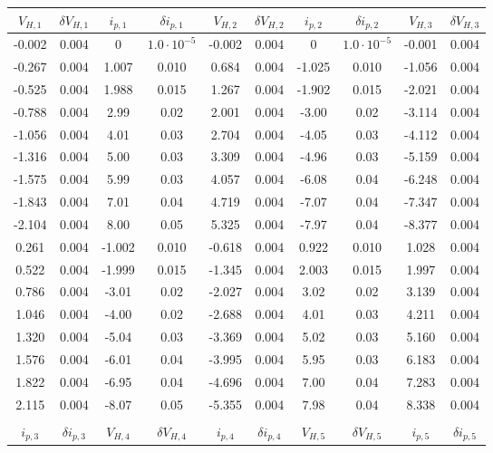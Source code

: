 \begin{table}
\centering \tiny
\begin{tabular}{cccccccccc}
$V_{H,1}$ & $\delta V_{H,1}$ & $i_{p,1}$ & $\delta i_{p,1}$ & $V_{H,2}$ & $\delta V_{H,2}$ & $i_{p,2}$ & $\delta i_{p,2}$ & $V_{H,3}$ & $\delta V_{H,3}$ \\
\hline
-0.002 & 0.004 & 0 & $1.0 \cdot 10^{-5}$ & -0.002 & 0.004 & 0 & $1.0 \cdot 10^{-5}$ & -0.001 & 0.004\\
-0.267 & 0.004 & 1.007 & 0.010 & 0.684 & 0.004 & -1.025 & 0.010 & -1.056 & 0.004\\
-0.525 & 0.004 & 1.988 & 0.015 & 1.267 & 0.004 & -1.902 & 0.015 & -2.021 & 0.004\\
-0.788 & 0.004 & 2.99 & 0.02 & 2.001 & 0.004 & -3.00 & 0.02 & -3.114 & 0.004\\
-1.056 & 0.004 & 4.01 & 0.03 & 2.704 & 0.004 & -4.05 & 0.03 & -4.112 & 0.004\\
-1.316 & 0.004 & 5.00 & 0.03 & 3.309 & 0.004 & -4.96 & 0.03 & -5.159 & 0.004\\
-1.575 & 0.004 & 5.99 & 0.03 & 4.057 & 0.004 & -6.08 & 0.04 & -6.248 & 0.004\\
-1.843 & 0.004 & 7.01 & 0.04 & 4.719 & 0.004 & -7.07 & 0.04 & -7.347 & 0.004\\
-2.104 & 0.004 & 8.00 & 0.05 & 5.325 & 0.004 & -7.97 & 0.04 & -8.377 & 0.004\\
0.261 & 0.004 & -1.002 & 0.010 & -0.618 & 0.004 & 0.922 & 0.010 & 1.028 & 0.004\\
0.522 & 0.004 & -1.999 & 0.015 & -1.345 & 0.004 & 2.003 & 0.015 & 1.997 & 0.004\\
0.786 & 0.004 & -3.01 & 0.02 & -2.027 & 0.004 & 3.02 & 0.02 & 3.139 & 0.004\\
1.046 & 0.004 & -4.00 & 0.02 & -2.688 & 0.004 & 4.01 & 0.03 & 4.211 & 0.004\\
1.320 & 0.004 & -5.04 & 0.03 & -3.369 & 0.004 & 5.02 & 0.03 & 5.160 & 0.004\\
1.576 & 0.004 & -6.01 & 0.04 & -3.995 & 0.004 & 5.95 & 0.03 & 6.183 & 0.004\\
1.822 & 0.004 & -6.95 & 0.04 & -4.696 & 0.004 & 7.00 & 0.04 & 7.283 & 0.004\\
2.115 & 0.004 & -8.07 & 0.05 & -5.355 & 0.004 & 7.98 & 0.04 & 8.338 & 0.004\\
      &&&&&&&&&\\
$i_{p,3}$ & $\delta i_{p,3}$ & $V_{H,4}$ & $\delta V_{H,4}$ & $i_{p,4}$ & $\delta i_{p,4}$ & $V_{H,5}$ & $\delta V_{H,5}$ & $i_{p,5}$ & $\delta i_{p,5}$ \\

\end{tabular}
\end{table}
